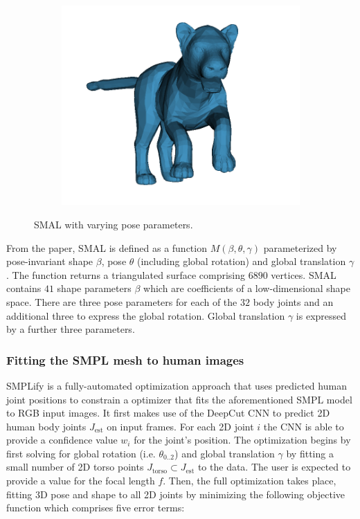 \begin{figure}[H]
            \begin{subfigure}{0.3\linewidth}
                \centering
                    \includegraphics[width=1\linewidth]{smal/pose_3}
            \end{subfigure}%
            \caption{SMAL with varying pose parameters.}
            \label{fig:smal_model_poses}
        \end{figure}

        From the paper, SMAL is defined as a function $M(\beta, \theta, \gamma)$ parameterized by pose-invariant shape $\beta$, pose $\theta$ (including global rotation) and global translation $\gamma$. The function returns a triangulated surface comprising $6890$ vertices. SMAL contains $41$ shape parameters $\beta$ which are coefficients of a low-dimensional shape space. There are three pose parameters for each of the $32$ body joints and an additional three to express the global rotation. Global translation $\gamma$ is expressed by a further three parameters.

        \subsubsection{Fitting the SMPL mesh to human images}
        SMPLify \cite{bogo16keep} is a fully-automated optimization approach that uses predicted human joint positions to constrain a optimizer that fits the aforementioned SMPL model to RGB input images. It first makes use of the DeepCut CNN to predict 2D human body joints $J_{\text{est}}$ on input frames. For each 2D joint $i$ the CNN is able to provide a confidence value $w_i$ for the joint's position. The optimization begins by first solving for global rotation (i.e. $\theta_{0..2}$) and global translation $\gamma$ by fitting a small number of 2D torso points $J_{\text{torso}} \subset J_{\text{est}}$ to the data. The user is expected to provide a value for the focal length $f$. Then, the full optimization takes place, fitting 3D pose and shape to all 2D joints by minimizing the following objective function which comprises five error terms:

